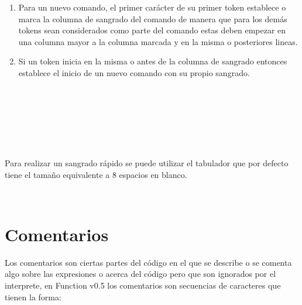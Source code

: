       \begin{enumerate}
         \item Para un nuevo comando, el primer carácter de su primer token establece o marca la columna de sangrado del comando de manera que para los demás tokens sean considerados como parte del comando estas deben empezar en una columna mayor a la columna marcada y en la misma o posteriores lineas.
         \item Si un token inicia en la misma o antes de la columna de sangrado entonces establece el inicio de un nuevo comando con su propio sangrado.
      \end{enumerate}
      
      \begin{fxcode}
         \\
         \\
          
      \end{fxcode}
      \begin{fxcode}
         \\
          
      \end{fxcode}
      \begin{fxcode}
         \\
          
      \end{fxcode}
   
      Para realizar un sangrado rápido se puede utilizar el tabulador que por defecto tiene el tamaño equivalente a 8 espacios en blanco.
      
      \begin{fxcode}
         \\
      \end{fxcode}
   \section{Comentarios}
      Los comentarios son ciertas partes del código en el que se describe o se comenta algo sobre las expresiones o acerca del código pero que son ignorados por el interprete, en Function v0.5 los comentarios son secuencias de caracteres que tienen la forma:
         
